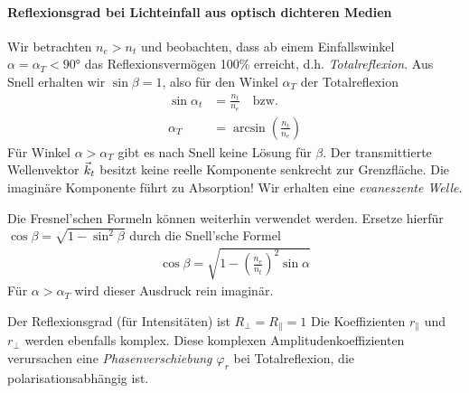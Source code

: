

\paragraph{Reflexionsgrad bei Lichteinfall aus optisch dichteren
  Medien}
Wir betrachten $n_e>n_t$ und beobachten, dass ab einem
Einfallswinkel $\alpha=\alpha_T<\ang{90}$ das Reflexionsvermögen
100\% erreicht, d.h. \emph{Totalreflexion}.
Aus Snell erhalten wir $\sin\beta = 1$, also für den Winkel
$\alpha_T$%
der Totalreflexion
\begin{align*}
  \sin\alpha_t &= \frac{n_t}{n_e} \quad\text{bzw.}\\
  \alpha_T &= \arcsin(\frac{n_t}{n_e})
\end{align*}
Für Winkel $\alpha>\alpha_T$ gibt es nach Snell keine Lösung
für $\beta$. Der transmittierte Wellenvektor $\vec{k}_t$ besitzt
keine reelle Komponente senkrecht zur Grenzfläche.
Die imaginäre Komponente führt zu Absorption! Wir erhalten eine
\emph{evaneszente Welle}.

Die Fresnel'schen Formeln können weiterhin verwendet
werden. Ersetze hierfür $\cos\beta = \sqrt{1-\sin^2\beta}$ durch
die Snell'sche Formel
\begin{gather*}
  \cos\beta = \sqrt{
    1 - \left(\frac{n_e}{n_t}\right)^2 \sin\alpha
  }
\end{gather*}
Für $\alpha>\alpha_T$ wird dieser Ausdruck rein imaginär.

Der Reflexionsgrad (für Intensitäten) ist $R_\bot=R_\parallel=1$
Die Koeffizienten $r_\parallel$ und $r_\bot$ werden ebenfalls komplex.
Diese komplexen Amplitudenkoeffizienten verursachen eine
\emph{Phasenverschiebung $\varphi_r$}
bei Totalreflexion, die polarisationsabhängig ist.

